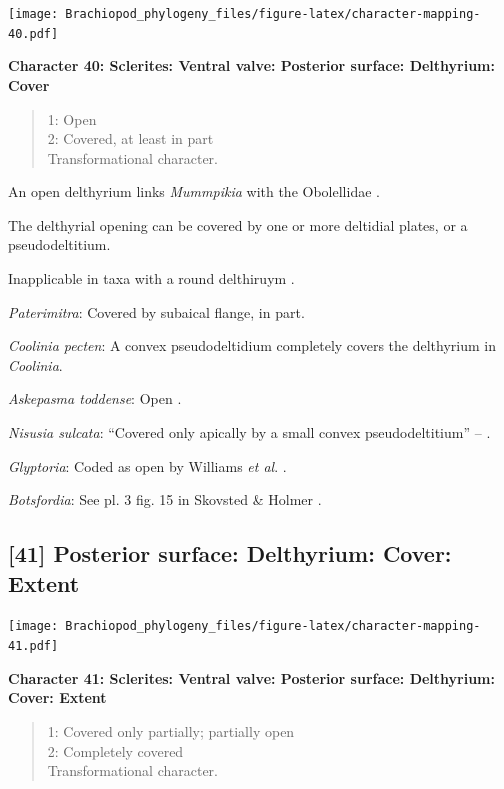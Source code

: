 \documentclass[]{book}
\theoremstyle{definition}
\theoremstyle{definition}
\theoremstyle{definition}
\theoremstyle{remark}
\begin{document}
\texttt{[image: Brachiopod\_phylogeny\_files/figure-latex/character-mapping-40.pdf]}

\textbf{Character 40: Sclerites: Ventral valve: Posterior surface:
Delthyrium: Cover}

\begin{quote}
1: Open\\
2: Covered, at least in part\\
Transformational character.
\end{quote}

An open delthyrium links \emph{Mummpikia} with the Obolellidae
\citep{Balthasar2008iMummpikia}.

The delthyrial opening can be covered by one or more deltidial plates,
or a pseudodeltitium.

Inapplicable in taxa with a round delthiruym \citep[generated by
overgrowth of the delthyrial opening by posterolateral parts of the
shell, per][]{Popov1992TheCambrian}.

\emph{Paterimitra}: Covered by subaical flange, in part.

\emph{Coolinia pecten}: A convex pseudodeltidium completely covers the
delthyrium in \emph{Coolinia}.

\emph{Askepasma toddense}: Open \citep{Topper2013Theoldest}.

\emph{Nisusia sulcata}: ``Covered only apically by a small convex
pseudodeltitium'' -- \citet{Holmer2018Evolutionarysignificance}.

\emph{Glyptoria}: Coded as open by Williams \emph{et al}.
\citeyearpar{Williams1998Thediversity}.

\emph{Botsfordia}: See pl. 3 fig. 15 in Skovsted \& Holmer
\citeyearpar{Skovsted2005EarlyCambrian}.

\hypertarget{posterior-surface-delthyrium-cover-extent}{%
\subsection*{{[}41{]} Posterior surface: Delthyrium: Cover:
Extent}\label{posterior-surface-delthyrium-cover-extent}}

\texttt{[image: Brachiopod\_phylogeny\_files/figure-latex/character-mapping-41.pdf]}

\textbf{Character 41: Sclerites: Ventral valve: Posterior surface:
Delthyrium: Cover: Extent}

\begin{quote}
1: Covered only partially; partially open\\
2: Completely covered\\
Transformational character.
\end{quote}
\end{document}
